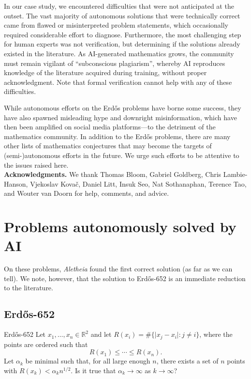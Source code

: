 \documentclass{article}
\theoremstyle{plain}
\theoremstyle{definition}
\newcommand{\Aletheia}{\emph{Aletheia}}
\begin{document}
In our case study, we encountered difficulties that were not anticipated at the outset. The vast majority of autonomous solutions that were technically correct came from flawed or misinterpreted problem statements, which occasionally required considerable effort to diagnose. Furthermore, the most challenging step for human experts was not verification, but determining if the solutions already existed in the literature. As AI-generated mathematics grows, the community must remain vigilant of ``subconscious plagiarism'', whereby AI  reproduces knowledge of the literature acquired during training, without proper acknowledgment. Note that formal verification cannot help with any of these difficulties. 

While autonomous efforts on the Erd\H{o}s problems have borne some success, they have also spawned misleading hype and downright misinformation, which have then been amplified on social media platforms---to the detriment of the mathematics community. In addition to the Erd\H{o}s problems, there are many other lists of mathematics conjectures that may become the targets of (semi-)autonomous efforts in the future. We urge such efforts to be attentive to the issues raised here. \\




\noindent \textbf{Acknowledgments.} We thank Thomas Bloom, Gabriel Goldberg, Chris Lambie-Hanson, Vjekoslav Kova\v{c}, Daniel Litt, Insuk Seo, Nat Sothanaphan, Terence Tao, and Wouter van Doorn for help, comments, and advice. \\


\section{Problems autonomously solved by AI}
On these problems, {\Aletheia} found the first correct solution (as far as we can tell). We note, however, that the solution to Erdős-652 is an immediate reduction to the literature.


\subsection{Erdős-652}

 
\begin{problem}{Erdős-652 \cite{Er97e}}
    Let $x_1,\ldots,x_n\in \mathbb{R}^2$ and let $R(x_i)=\#\{ \lvert x_j-x_i\rvert : j\neq i\}$, where the points are ordered such that\[R(x_1)\leq \cdots \leq R(x_n).\]Let $\alpha_k$ be minimal such that, for all large enough $n$, there exists a set of $n$ points with $R(x_k)<\alpha_kn^{1/2}$. Is it true that $\alpha_k\to \infty$ as $k\to \infty$?
\end{problem}
\end{document}
